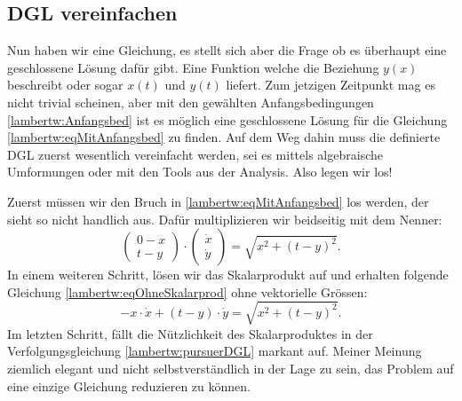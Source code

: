 \subsection{DGL vereinfachen
	\label{lambertw:subsection:DGLvereinfach}}
Nun haben wir eine Gleichung, es stellt sich aber die Frage ob es überhaupt eine geschlossene Lösung dafür gibt. Eine Funktion welche die Beziehung \(y(x)\) beschreibt oder sogar \(x(t)\) und \(y(t)\) liefert. Zum jetzigen Zeitpunkt mag es nicht trivial scheinen, aber mit den gewählten Anfangsbedingungen \eqref{lambertw:Anfangsbed} ist es möglich eine geschlossene Lösung für die Gleichung \eqref{lambertw:eqMitAnfangsbed} zu finden.
Auf dem Weg dahin muss die definierte DGL zuerst wesentlich vereinfacht werden, sei es mittels algebraische Umformungen oder mit den Tools aus der Analysis. Also legen wir los! 

Zuerst müssen wir den Bruch in \eqref{lambertw:eqMitAnfangsbed} los werden, der sieht so nicht handlich aus. Dafür multiplizieren wir beidseitig mit dem Nenner:
\begin{equation}
	\left( \begin{array}{c} 0-x \\ t-y \end{array} \right)
	\cdot
	\left(\begin{array}{c} \dot{x} \\ \dot{y} \end{array}\right)
	= \sqrt{x^2 + (t-y)^2}.
	\label{lambertw:eqOhneBruch}
\end{equation}
In einem weiteren Schritt, lösen wir das Skalarprodukt auf und erhalten folgende Gleichung \eqref{lambertw:eqOhneSkalarprod} ohne vektorielle Grössen:
\begin{equation}
		-x \cdot \dot{x} + (t-y) \cdot \dot{y}
		= \sqrt{x^2 + (t-y)^2}.
		\label{lambertw:eqOhneSkalarprod}
\end{equation}
Im letzten Schritt, fällt die Nützlichkeit des Skalarproduktes in der Verfolgungsgleichung \eqref{lambertw:pursuerDGL} markant auf. Meiner Meinung ziemlich elegant und nicht selbstverständlich in der Lage zu sein, das Problem auf eine einzige Gleichung reduzieren zu können.

